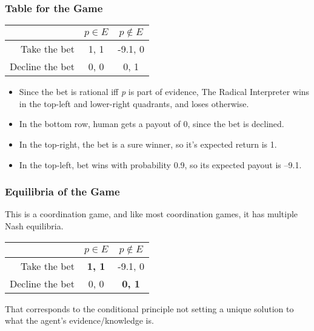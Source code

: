 \begin{frame}

\frametitle{Table for the Game}
\label{tableforthegame}


\begin{center}
\begin{tabular}{r | c c}
& $p \in E$ & $p \notin E$ \\ \hline
Take the bet & 1, 1 & -9.1, 0 \\
Decline the bet & 0, 0 & 0, 1
\end{tabular}
\end{center}


\begin{itemize}
\item Since the bet is rational iff \emph{p} is part of evidence, The Radical Interpreter wins in the top-left and lower-right quadrants, and loses otherwise.

\item In the bottom row, human gets a payout of 0, since the bet is declined.

\item In the top-right, the bet is a sure winner, so it's expected return is 1.

\item In the top-left, bet wins with probability 0.9, so its expected payout is --9.1.

\end{itemize}
\end{frame}

\begin{frame}

\frametitle{Equilibria of the Game}
\label{equilibriaofthegame}

This is a coordination game, and like most coordination games, it has multiple Nash equilibria.


\begin{center}
\begin{tabular}{r | c c}
& $p \in E$ & $p \notin E$ \\ \hline
Take the bet & \textbf{1, 1} & -9.1, 0 \\
Decline the bet & 0, 0 & \textbf{0, 1}
\end{tabular}
\end{center}


That corresponds to the conditional principle not setting a unique solution to what the agent's evidence\slash knowledge is.

\end{frame}

